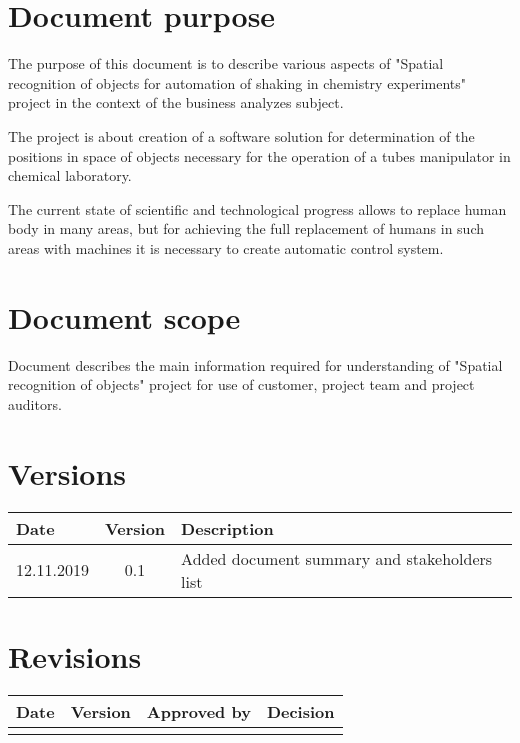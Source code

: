 \section{Document purpose} 

The purpose of this document is to describe various aspects of "Spatial recognition of objects
for automation of shaking in chemistry experiments" project in the context of the business analyzes subject.


The project is about creation of a software solution for determination of the positions
in space of objects necessary for the operation of a tubes manipulator in chemical laboratory.

The current state of scientific and technological progress allows to replace human body
in many areas, but for achieving the full replacement of humans in such areas with machines
it is necessary to create automatic control system.


\section{Document scope}

Document describes the main information required for understanding of "Spatial recognition of objects"
project for use of customer, project team and project auditors.


\section{Versions}

\begin{tabular}{ | l | c | l | }
	\hline
	Date & Version & Description \\ \hline
	12.11.2019 &  0.1 & Added document summary and stakeholders list\\ \hline
\end{tabular}


\section{Revisions}

\begin{tabular}{ | l | c | c | l | }
	\hline
	Date & Version & Approved by & Decision \\ \hline
	& & & \\ \hline
\end{tabular}